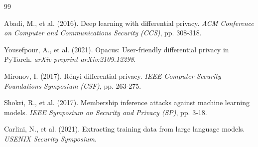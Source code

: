 \documentclass[11pt,onecolumn,a4paper]{article}
\begin{document}
\begin{thebibliography}{99}

Abadi, M., et al. (2016). Deep learning with differential privacy. \textit{ACM Conference on Computer and Communications Security (CCS)}, pp. 308-318.

Yousefpour, A., et al. (2021). Opacus: User-friendly differential privacy in PyTorch. \textit{arXiv preprint arXiv:2109.12298}.

Mironov, I. (2017). Rényi differential privacy. \textit{IEEE Computer Security Foundations Symposium (CSF)}, pp. 263-275.

Shokri, R., et al. (2017). Membership inference attacks against machine learning models. \textit{IEEE Symposium on Security and Privacy (SP)}, pp. 3-18.

Carlini, N., et al. (2021). Extracting training data from large language models. \textit{USENIX Security Symposium}.

\end{thebibliography}
\end{document}
